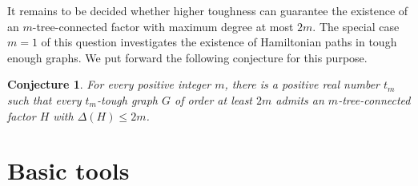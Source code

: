 \documentclass[10pt,bezier]{article}
\newtheorem{preconj}[prethm]{{\bf Conjecture}}
\newenvironment{conj}{\begin{preconj}{\hspace{-0.5
em}{\bf.}}}{\end{preconj}}
\begin{document}
It remains to be decided whether 
higher toughness can guarantee the existence
 of an $m$-tree-connected factor with maximum degree at most $2m$.
The special case $m=1$ of this question investigates the existence of Hamiltonian paths in tough enough graphs.
We put forward the following conjecture for this purpose.
%
\begin{conj}
{For every positive integer $m$, there is a positive real number $t_m$ such that every $t_m$-tough graph $G$ of order at least $2m$ admits an $m$-tree-connected factor $H$ with $\Delta(H)\le 2m$.
}\end{conj}
%
%
%
%
%
%
%
%
%
%
%
%
\section{Basic tools}
\label{subsec:Basic tools}
\end{document}
